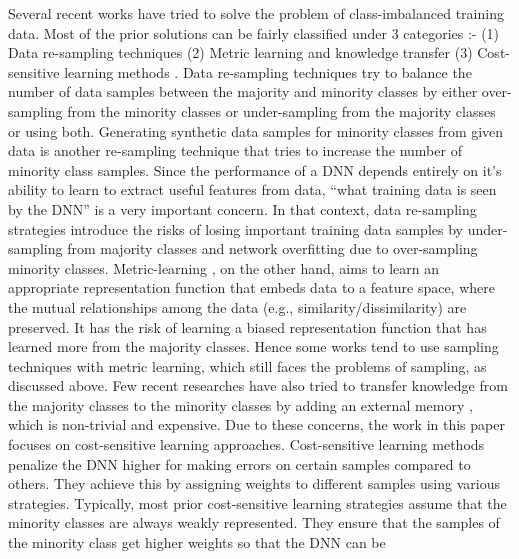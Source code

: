\documentclass[runningheads]{llncs}
\begin{document}
Several recent works have tried to solve the problem of 
class-imbalanced training data. Most of the prior solutions can be fairly classified 
under 3 categories :- (1) Data re-sampling techniques \cite{SMOTE,Diversity_based_oversampling,Undersampling_1} 
(2) Metric learning and knowledge transfer \cite{deepmetriclearning,metriclearning2,metriclearning3,metalearning1}
(3) Cost-sensitive 
learning methods \cite{FOCALloss,Class_balancedloss,Equalizationloss,Gradient_harmonised}. Data re-sampling techniques try to balance the number of data 
samples between the majority and minority classes by either over-sampling from 
the minority classes or under-sampling from the majority classes or using both. 
Generating synthetic data samples for minority classes \cite{SMOTE,BorderlineSMOTE,SafelevelSMOTE} from given 
data is another
re-sampling technique that tries to increase the number of minority class 
samples.
Since the performance of a DNN depends entirely on it’s ability to learn to 
extract
useful features from data, “what training data is seen by the DNN” is a very 
important
concern. In that context, data re-sampling strategies introduce the risks of 
losing important training data samples by under-sampling from majority classes 
and network
overfitting due to over-sampling minority classes. Metric-learning 
\cite{deepmetriclearning,metriclearning2}, on the other hand, aims to learn an 
appropriate representation function that embeds data to a feature space, where 
the mutual relationships among the data (e.g., similarity/dissimilarity) are 
preserved. It has the risk of learning a biased representation function that has 
learned more from the majority classes. Hence some works  \cite{metriclearning3} 
tend to use sampling techniques with metric learning, which still faces the 
problems of sampling, as discussed above. Few recent researches have also tried 
to transfer knowledge from the majority classes to the minority classes by 
adding an external memory \cite{OLTR}, which is non-trivial and expensive. Due 
to these 
concerns, the 
work
in this paper focuses on cost-sensitive learning approaches. Cost-sensitive 
learning
methods penalize the DNN higher for making errors on certain samples compared
to others. They achieve this by assigning weights to different samples using 
various
strategies. Typically, most prior cost-sensitive learning strategies \cite{Inverse_freq1,Smoothed_inv,Class_balancedloss} 
assume
that the minority classes are always weakly represented. They ensure that the 
samples of the minority class get higher weights so that the DNN can be 
\end{document}
